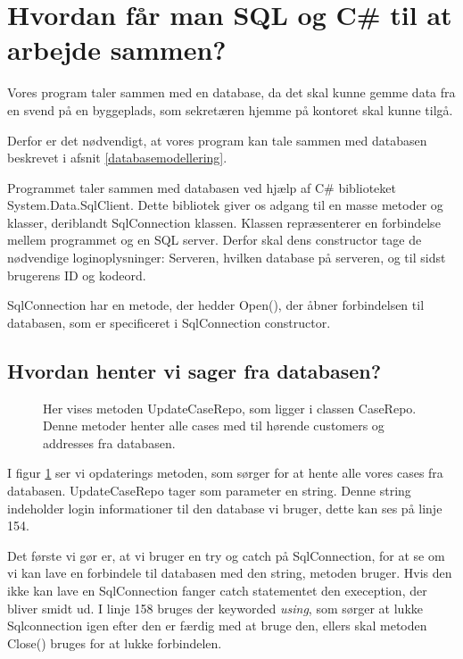 \section{Hvordan får man SQL og C\# til at arbejde sammen?}\label{arkitektur}

Vores program taler sammen med en database, da det skal kunne gemme data fra en svend på en byggeplads, som sekretæren hjemme på kontoret skal kunne tilgå.

Derfor er det nødvendigt, at vores program kan tale sammen med databasen beskrevet i afsnit \ref{databasemodellering}.

Programmet taler sammen med databasen ved hjælp af C\# biblioteket System.Data.SqlClient.\cite{sqlclient}
Dette bibliotek giver os adgang til en masse metoder og klasser, deriblandt SqlConnection klassen.
Klassen repræsenterer en forbindelse mellem programmet og en SQL server.
Derfor skal dens constructor tage de nødvendige loginoplysninger: Serveren, hvilken database på serveren, og til sidst brugerens ID og kodeord.

SqlConnection har en metode, der hedder Open(), der åbner forbindelsen til databasen, som er specificeret i SqlConnection constructor.

\subsection{Hvordan henter vi sager fra databasen?}

\begin{figure}[H]
    \caption{Her vises metoden UpdateCaseRepo, som ligger i classen CaseRepo. Denne metoder henter alle cases med til hørende customers og addresses fra databasen.}
    \label{fig:UpdateCaseRepo}
\end{figure}

I figur \ref{fig:UpdateCaseRepo} ser vi opdaterings metoden, som sørger for at hente alle vores cases fra databasen.
UpdateCaseRepo tager som parameter en string.
Denne string indeholder login informationer til den database vi bruger, dette kan ses på linje 154.

Det første vi gør er, at vi bruger en try og catch på SqlConnection, for at se om vi kan lave en forbindele til databasen med den string, metoden bruger.
Hvis den ikke kan lave en SqlConnection fanger catch statementet den exeception, der bliver smidt ud.
I linje 158 bruges der keyworded \textit{using}, som sørger at lukke Sqlconnection igen efter den er færdig med at bruge den, ellers skal metoden Close() bruges for at lukke forbindelen.

